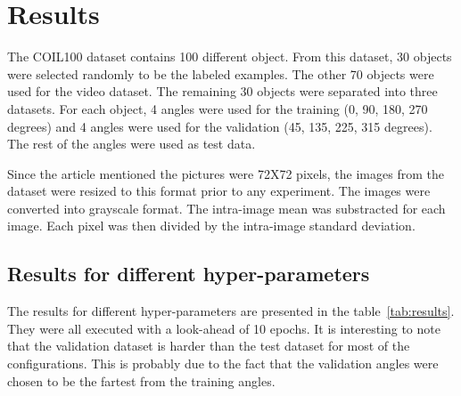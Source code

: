 \section{Results}
The COIL100 dataset contains 100 different object. From this dataset, 30 objects were selected randomly to be the labeled examples. The other 70 objects were used for the video dataset. The remaining 30 objects were separated into three datasets. For each object, 4 angles were used for the training (0, 90, 180, 270 degrees) and 4 angles were used for the validation (45, 135, 225, 315 degrees). The rest of the angles were used as test data.

Since the article mentioned the pictures were 72X72 pixels, the images from the dataset were resized to this format prior to any experiment. The images were converted into grayscale format. The intra-image mean was substracted for each image. Each pixel was then divided by the intra-image standard deviation.


\subsection{Results for different hyper-parameters}

The results for different hyper-parameters are presented in the table~\ref{tab:results}. They were all executed with a look-ahead of 10 epochs. It is interesting to note that the validation dataset is harder than the test dataset for most of the configurations. This is probably due to the fact that the validation angles were chosen to be the fartest from the training angles.

